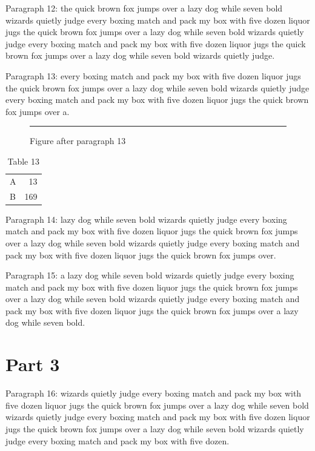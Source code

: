 \documentclass[twocolumn]{article}
\begin{document}
Paragraph 12: the quick brown fox jumps over a lazy dog while seven bold wizards quietly judge every boxing match and pack my box with five dozen liquor jugs the quick brown fox jumps over a lazy dog while seven bold wizards quietly judge every boxing match and pack my box with five dozen liquor jugs the quick brown fox jumps over a lazy dog while seven bold wizards quietly judge.

Paragraph 13: every boxing match and pack my box with five dozen liquor jugs the quick brown fox jumps over a lazy dog while seven bold wizards quietly judge every boxing match and pack my box with five dozen liquor jugs the quick brown fox jumps over a.

\begin{figure}[tbp]\centering\rule{0.8\columnwidth}{8em}\caption{Figure after paragraph 13}\end{figure}
\begin{table}[htb]\centering\begin{tabular}{lr}A & 13\\ B & 169\end{tabular}\caption{Table 13}\end{table}
Paragraph 14: lazy dog while seven bold wizards quietly judge every boxing match and pack my box with five dozen liquor jugs the quick brown fox jumps over a lazy dog while seven bold wizards quietly judge every boxing match and pack my box with five dozen liquor jugs the quick brown fox jumps over.

Paragraph 15: a lazy dog while seven bold wizards quietly judge every boxing match and pack my box with five dozen liquor jugs the quick brown fox jumps over a lazy dog while seven bold wizards quietly judge every boxing match and pack my box with five dozen liquor jugs the quick brown fox jumps over a lazy dog while seven bold.

\section{Part 3}
Paragraph 16: wizards quietly judge every boxing match and pack my box with five dozen liquor jugs the quick brown fox jumps over a lazy dog while seven bold wizards quietly judge every boxing match and pack my box with five dozen liquor jugs the quick brown fox jumps over a lazy dog while seven bold wizards quietly judge every boxing match and pack my box with five dozen.
\end{document}
